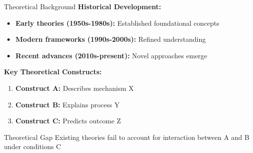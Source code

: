 \documentclass[aspectratio=169,12pt]{beamer}
\begin{document}
\begin{frame}{Theoretical Background}
  \textbf{Historical Development:}
  \begin{itemize}
    \item \textbf{Early theories (1950s-1980s):} Established foundational concepts \cite{foundational1975}
    \item \textbf{Modern frameworks (1990s-2000s):} Refined understanding \cite{refinement2000}
    \item \textbf{Recent advances (2010s-present):} Novel approaches emerge \cite{recent2018}
  \end{itemize}
  
  \vspace{0.5cm}
  
  \textbf{Key Theoretical Constructs:}
  \begin{enumerate}
    \item \textbf{Construct A:} Describes mechanism X
    \item \textbf{Construct B:} Explains process Y
    \item \textbf{Construct C:} Predicts outcome Z
  \end{enumerate}
  
  \vspace{0.5cm}
  
  \begin{block}{Theoretical Gap}
    Existing theories fail to account for interaction between A and B under conditions C
  \end{block}
\end{frame}
\end{document}
